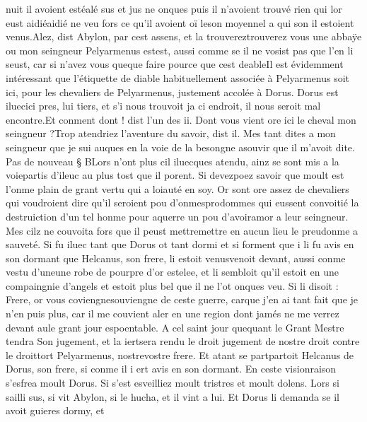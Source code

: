 \documentclass{article}
\begin{document}
\begin{pages}
      nuit il avoient estéalé 
      sus et jus ne onques puis il n’avoient trouvé 
      rien qui lor eust aidiéaidié ne veu fors ce qu’il avoient oï 
      leson moyennel a qui son il estoient venus.Alez, dist Abylon, par cest assens, 
      et la trouvereztrouverez vous 
      une abbaÿe ou mon seingneur 
      Pelyarmenus 
      estest, aussi comme se il ne vosist pas que l'en li seust, 
      car si n’avez vous queque faire pource que cest 
      deableIl est évidemment intéressant que l'étiquette de diable habituellement associée à Pelyarmenus 
      soit ici, pour les chevaliers de Pelyarmenus, justement accolée à Dorus. 
      Dorus est iluecici pres, lui tiers, 
      et s’i nous trouvoit ja ci endroit, il nous seroit mal encontre.Et conment dont ! dist l’un des ii. 
   Dont vous vient ore ici le cheval mon seingneur ?Trop atendriez l’aventure du savoir, dist il. Mes tant dites a 
      mon seingneur que je sui auques en la voie de la besongne 
         asouvir que il m’avoit dite. \pend
\pstart Pas de nouveau § BLors n’ont plus cil iluecques atendu, 
   ainz se sont mis a la voiepartis d'ileuc au plus tost que il porent. 
   Si devezpoez savoir que moult est l’onme plain de 
   grant vertu qui a loiauté en soy. Or sont ore assez de chevaliers qui voudroient dire qu’il seroient 
   pou d’onmesprodommes qui eussent convoitié la destruiction d’un tel honme 
   pour aquerre un pou d’avoiramor a leur seingneur. Mes cilz ne couvoita fors 
   que il peust mettremettre en aucun lieu le preudonme a sauveté. 
   Si fu iluec tant que Dorus ot tant dormi et si forment que i li fu avis en son dormant que 
   Helcanus, son frere, li estoit venusvenoit 
   devant, aussi conme vestu d’uneune robe de pourpre d’or estelee, 
   et li sembloit qu’il estoit en une compaingnie d’angels et estoit plus bel que il ne l’ot onques veu. Si li disoit :
   Frere, or vous coviengnesouviengne de 
      ceste guerre, carque 
      j’en ai tant fait que je n’en puis plus, car il me couvient aler en une region dont jamés ne me verrez devant 
      aule grant jour 
      espoentable. A cel saint jour 
      quequant le Grant Mestre tendra Son jugement, et la 
      iertsera rendu le 
      droit jugement de nostre droit contre le 
      droittort Pelyarmenus, 
      nostrevostre frere.
   Et atant se partpartoit Helcanus de 
   Dorus, son frere, si conme il i ert avis en son dormant. \pend
\pstart En ceste visionraison s’esfrea moult 
   Dorus. 
   Si s’est esveilliez moult tristres et moult dolens. Lors si sailli sus, si vit Abylon, si le hucha, 
   et il vint a lui. Et Dorus li demanda se il avoit guieres dormy, et 

\end{pages}
\end{document}
